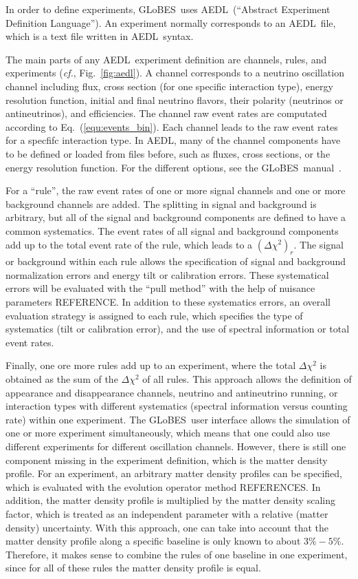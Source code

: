 \documentclass[12pt,a4paper]{article}
\newcommand{\cf}{{\it cf.}}
\newcommand{\eq}{Eq.}
\newcommand{\fig}{Fig.}
\newcommand{\GLOBES}{{\sf GLoBES}}
\newcommand{\AEDL}{{\sf AEDL}}
\newcommand{\equ}[1]{\eq~(\ref{equ:#1})}
\newcommand{\figu}[1]{\fig~\ref{fig:#1}}
\begin{document}
In order to define experiments, \GLOBES\ uses \AEDL\ (``Abstract
Experiment Definition Language''). An experiment normally corresponds
to an \AEDL\ file, which is a text file written in \AEDL\ syntax.

The main parts of any \AEDL\ experiment definition are channels,
rules, and experiments (\cf, \figu{aedl}). A channel corresponds to a neutrino oscillation channel including flux, cross section (for one specific interaction type), energy resolution function, initial and final neutrino flavors, their polarity (neutrinos or antineutrinos), and efficiencies. The channel raw event rates are computated according to \equ{events_bin}. Each channel leads to the raw event rates for a 
specfifc interaction type. In \AEDL , many of the channel components
have to be defined or loaded from files before, such as fluxes, 
cross sections, or the energy resolution function. For the
different options, see the \GLOBES\ manual~\cite{Manual}.

For a ``rule'', the raw event rates of one or more signal channels and
one or more background channels are added. The splitting in signal and
background is arbitrary, but all of the signal and background components
are defined to have a common systematics. The event rates of all 
signal and background components add up to the total event rate of the
rule, which leads to a $(\Delta \chi^2)_r$. The signal or background
within each rule allows the specification of signal and background normalization errors and energy tilt or calibration errors. 
These systematical errors will be evaluated with the ``pull method''
with the help of nuisance parameters REFERENCE. In addition to these
systematics errors, an overall evaluation strategy is assigned 
to each rule, which specifies the type of systematics (tilt or calibration
error), and the use of spectral information or total event rates.   

Finally, one ore more rules add up to an experiment, where the
total $\Delta \chi^2$ is obtained as the sum of the $\Delta \chi^2$
of all rules. This approach allows the definition of 
appearance and disappearance channels, neutrino and antineutrino running, or interaction types with different systematics (spectral information
versus counting rate) within one experiment. The \GLOBES\ user interface
allows the simulation of one or more experiment simultaneously, which
means that one could also use different experiments for different
oscillation channels. However, there is still one component missing
in the experiment definition, which is the matter density profile.
For an experiment, an arbitrary matter density profiles can be specified, which is evaluated with the evolution operator method REFERENCES.
In addition, the matter density profile is multiplied by the matter
density scaling factor, which is treated as an independent parameter
with a relative (matter density) uncertainty. With this
approach, one can take into account that the matter density profile along a specific baseline is only known to about $3\%-5\%$. Therefore, it makes
sense to combine the rules of one baseline in one experiment,
since for all of these rules the matter density profile is equal.
\end{document}
